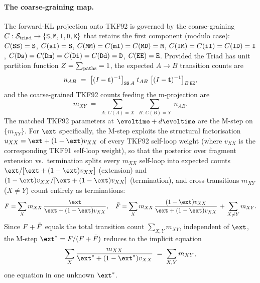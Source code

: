 \paragraph{The coarse-graining map.}
The forward-KL projection onto TKF92 is governed by the coarse-graining
$C:\mathcal{S}_{\rm triad}\to\{\mathtt{S},\mathtt{M},\mathtt{I},\mathtt{D},\mathtt{E}\}$ that retains the first
component (modulo case):
$C(\mathtt{SS})=\mathtt{S}$, $C(\mathtt{sI})=\mathtt{S}$,
$C(\mathtt{MM})=C(\mathtt{mI})=C(\mathtt{MD})=\mathtt{M}$,
$C(\mathtt{IM})=C(\mathtt{iI})=C(\mathtt{ID})=\mathtt{I}$,
$C(\mathtt{Ds})=C(\mathtt{Dm})=C(\mathtt{Di})=C(\mathtt{Dd})=\mathtt{D}$,
$C(\mathtt{EE})=\mathtt{E}$.
Provided the Triad has unit partition function $Z=\sum_{\rm paths}=1$, the
expected $A\to B$ transition counts are
\begin{equation}
\label{eq:triad-counts}
n_{AB}\;=\;\bigl[(I-{\bf t})^{-1}\bigr]_{\mathtt{SS}\,A}\;t_{AB}\;
       \bigl[(I-{\bf t})^{-1}\bigr]_{B\,\mathtt{EE}},
\end{equation}
and the coarse-grained TKF92 counts feeding the m-projection are
\begin{equation}
\label{eq:triad-pullback}
m_{XY}\;=\;\sum_{A:\,C(A)=X}\;\sum_{B:\,C(B)=Y}\;n_{AB}.
\end{equation}
The matched TKF92 parameters at $\evoltime+d\evoltime$ are the M-step on
$\{m_{XY}\}$.  For $\ext$ specifically, the M-step exploits the structural
factorisation $u_{XX}=\ext+(1-\ext)v_{XX}$ of every TKF92 self-loop weight
(where $v_{XX}$ is the corresponding TKF91 self-loop weight), so that the
posterior over fragment extension vs.\ termination splits every $m_{XX}$
self-loop into expected counts
$\ext/[\ext+(1-\ext)v_{XX}]$ (extension) and
$(1-\ext)v_{XX}/[\ext+(1-\ext)v_{XX}]$ (termination), and cross-transitions
$m_{XY}$ ($X\neq Y$) count entirely as terminations:
\begin{equation}
\label{eq:triad-frag-decomp}
\nfragext = \sum_X m_{XX}\,\frac{\ext}{\ext+(1-\ext)v_{XX}},\quad
\nfragend = \sum_X m_{XX}\,\frac{(1-\ext)v_{XX}}{\ext+(1-\ext)v_{XX}}\,+\,\sum_{X\neq Y}m_{XY}.
\end{equation}
Since $F+\bar F$ equals the total transition count $\sum_{X,Y}m_{XY}$,
independent of $\ext$, the M-step $\ext^\ast=\nfragext/(\nfragext+\nfragend)$
reduces to the implicit equation
\begin{equation}
\label{eq:triad-r-implicit}
\sum_X \frac{m_{XX}}{\ext^\ast+(1-\ext^\ast)v_{XX}}\;=\;\sum_{X,Y} m_{XY},
\end{equation}
one equation in one unknown $\ext^\ast$.

